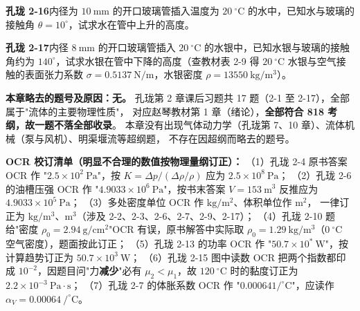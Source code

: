 \begin{ti}
\item \textbf{孔珑 2-16}\quad 内径为 $10\ \mathrm{mm}$ 的开口玻璃管插入温度为 $20\ ^{\circ}\mathrm{C}$ 的水中，已知水与玻璃的接触角 $\theta=10^{\circ}$，试求水在管中上升的高度。

\item \textbf{孔珑 2-17}\quad 内径 $8\ \mathrm{mm}$ 的开口玻璃管插入 $20\ ^{\circ}\mathrm{C}$ 的水银中，已知水银与玻璃的接触角约为 $140^{\circ}$，试求水银在管中下降的高度（查教材表 2-9 得 $20\ ^{\circ}\mathrm{C}$ 水银与空气接触的表面张力系数 $\sigma=0.5137\ \mathrm{N/m}$，水银密度 $\rho=13550\ \mathrm{kg/m^3}$）。

\end{ti}

\begin{tishi}
\textbf{本章略去的题号及原因：无。}
孔珑第 2 章课后习题共 17 题（2-1 至 2-17），全部属于"流体的主要物理性质"，
对应赵琴教材第 1 章（绪论），\textbf{全部符合 818 考纲，故一题不落全部收录}。
本章没有出现气体动力学（孔珑第 7、10 章）、流体机械（泵与风机）、明渠堰流等超纲题，
不存在因超纲而略去的题号。
\end{tishi}

\begin{tishi}
\textbf{OCR 校订清单（明显不合理的数值按物理量纲订正）：}
（1）孔珑 2-4 原书答案 OCR 作 "$2.5\times10^{2}\ \mathrm{Pa}$"，按
$K=\Delta p/(\Delta\rho/\rho)$ 应为 $2.5\times10^{8}\ \mathrm{Pa}$；
（2）孔珑 2-6 的油槽压强 OCR 作 "$4.9033\times10^{6}\ \mathrm{Pa}$"，按书末答案
$V=153\ \mathrm{m^3}$ 反推应为 $4.9033\times10^{5}\ \mathrm{Pa}$；
（3）多处密度单位 OCR 作 $\mathrm{kg/m^2}$、体积单位作 $\mathrm{m^2}$，
一律订正为 $\mathrm{kg/m^3}$、$\mathrm{m^3}$（涉及 2-2、2-3、2-6、2-7、2-9、2-17）；
（4）孔珑 2-10 题给"密度 $\rho_0=2.94\ \mathrm{g/cm^2}$"OCR 有误，原书解答中实际取
$\rho_0=1.29\ \mathrm{kg/m^3}$（$0\ ^{\circ}\mathrm{C}$ 空气密度），题面按此订正；
（5）孔珑 2-13 的功率 OCR 作 "$50.7\times10^{*}\ \mathrm{W}$"，按计算趋势订正为
$50.7\times10^{3}\ \mathrm{W}$；
（6）孔珑 2-15 图中读数 OCR 把两个指数都印成 $10^{-2}$，因题目问"力\textbf{减少}"必有
$\mu_2<\mu_1$，故 $120\ ^{\circ}\mathrm{C}$ 时的黏度订正为 $2.2\times10^{-3}\ \mathrm{Pa\cdot s}$；
（7）孔珑 2-7 的体胀系数 OCR 作 "$0.000641/^{\circ}\mathrm{C}$"，应读作
$\alpha_V=0.00064\ /^{\circ}\mathrm{C}$。
\end{tishi}

